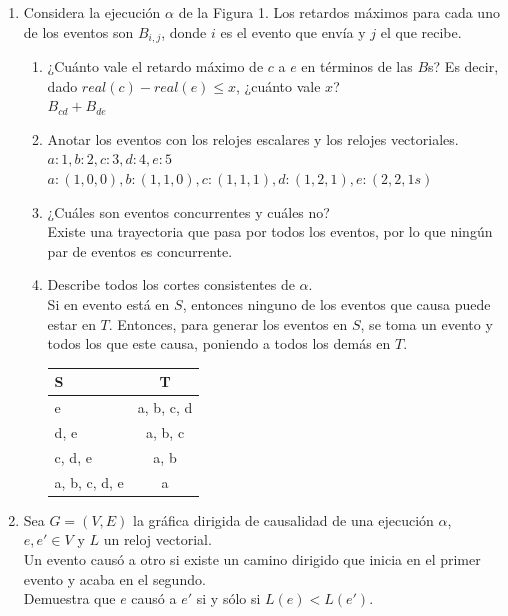 \documentclass[12pt,a4paper]{report}
\begin{document}
\begin{enumerate}
	\item {
		Considera la ejecución $\alpha$ de la Figura 1. Los retardos máximos
		para cada uno de los eventos son $B_{i, j}$, donde $i$ es el evento
		que envía y $j$ el que recibe.
		\begin{enumerate}
			\item {
				¿Cuánto vale el retardo máximo de $c$ a $e$ en términos de
				las $B$s? Es decir, dado $real(c)-real(e) \leq x$, ¿cuánto
				vale $x$?\\
				$B_{cd} + B_{de}$
			}

			\item {
				Anotar los eventos con los relojes escalares y los relojes
				vectoriales.\\
				$a:1, b:2, c:3, d:4, e:5$\\
				$a:(1, 0, 0), b:(1, 1, 0), c:(1, 1, 1), d:(1, 2, 1), e:(2, 2, 1s)$
			}

			\item {
				¿Cuáles son eventos concurrentes y cuáles no?\\
				Existe una trayectoria que pasa por todos los eventos, por
				lo que ningún par de eventos es concurrente.
			}

			\item {
				Describe todos los cortes consistentes de $\alpha$.\\
				Si en evento está en $S$, entonces ninguno de los eventos
				que causa puede estar en $T$. Entonces, para generar los
				eventos en $S$, se toma un evento y todos los que este causa,
				poniendo a todos los demás en $T$.\\
				\begin{tabular}{| l | c |}
					\hline
						S & T \\ \hline
						e & a, b, c, d \\ \hline
						d, e & a, b, c \\ \hline
					    c, d, e & a, b \\ \hline
					    a, b, c, d, e & a \\
					\hline
				\end{tabular}
			}
		\end{enumerate}
	}

	\item {
		Sea $G = (V, E)$ la gráfica dirigida de causalidad de una ejecución
		$\alpha$, $e, e' \in V$ y $L$ un reloj vectorial.\\
		Un evento causó a otro si existe un camino dirigido que inicia en
		el primer evento y acaba en el segundo.\\
		Demuestra que $e$ causó a $e'$ si y sólo si $L(e) < L(e')$.
	}


\end{enumerate}
\end{document}
